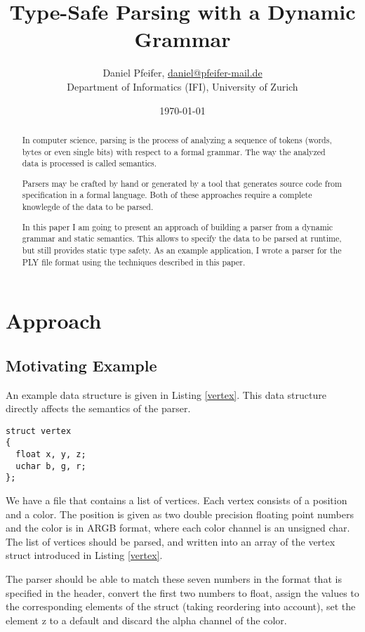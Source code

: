 \documentclass[a4paper, parskip=half, twocolumn]{scrartcl}
\title{Type-Safe Parsing with a Dynamic Grammar}
\author{Daniel Pfeifer,
\href{mailto:daniel@pfeifer-mail.de}{daniel@pfeifer-mail.de} \\
Department of Informatics (IFI), University of Zurich}
\date{\today}
\begin{document}
\maketitle

\begin{abstract}
In computer science, parsing is the process of analyzing a sequence of tokens
(words, bytes or even single bits) with respect to a formal grammar. The way
the analyzed data is processed is called semantics.

Parsers may be crafted by hand or generated by a tool that generates source code
from specification in a formal language. Both of these approaches require a
complete knowlegde of the data to be parsed.

In this paper I am going to present an approach of building a parser from a
dynamic grammar and static semantics. This allows to specify the data to be
parsed at runtime, but still provides static type safety. As an example
application, I wrote a parser for the PLY file format using the techniques
described in this paper.
\end{abstract}









\section{Approach}
\subsection{Motivating Example}
An example data structure is
given in Listing \ref{vertex}. This data structure directly affects the
semantics of the parser.

\begin{lstlisting}[frame=tb,label=vertex,caption=Vertex Example]
struct vertex
{
  float x, y, z;
  uchar b, g, r;
};
\end{lstlisting}

We have a file that contains a list of vertices. Each vertex consists of a
position and a color. The position is given as two double precision floating
point numbers and the color is in ARGB format, where each color channel is an
unsigned char. The list of vertices should be parsed, and written into an array
of the vertex struct introduced in Listing \ref{vertex}.

The parser should be able to match these seven numbers in the format that is
specified in the header, convert the first two numbers to float, assign the
values to the corresponding elements of the struct (taking reordering into
account), set the element z to a default and discard the alpha channel of the
color.
\end{document}
